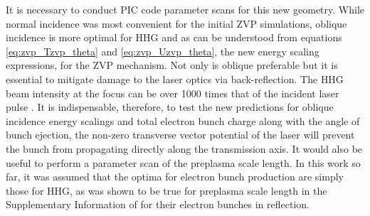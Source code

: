 It is necessary to conduct PIC code parameter scans for this new geometry. While normal incidence was most convenient for the initial ZVP simulations, oblique incidence is more optimal for \ac{HHG} \cite{gonoskovUltrarelativisticNanoplasmonicsRoute2011, edwardsXRayEmissionEffectiveness2020} and as can be understood from equations \ref{eq:zvp_Tzvp_theta} and \ref{eq:zvp_Uzvp_theta}, the new energy scaling expressions, for the ZVP mechanism. Not only is oblique preferable but it is essential to mitigate damage to the laser optics via back-reflection. The \ac{HHG} beam intensity at the focus can be over 1000 times that of the incident laser pulse \cite{quereReflectingPetawattLasers2021}. It is indispensable, therefore, to test the new predictions for oblique incidence energy scalings and total electron bunch charge along with the angle of bunch ejection, the non-zero transverse vector potential of the laser will prevent the bunch from propagating directly along the transmission axis. It would also be useful to perform a parameter scan of the preplasma scale length. In this work so far, it was assumed that the optima for electron bunch production are simply those for \ac{HHG}, as was shown to be true for preplasma scale length in the Supplementary Information of \cite{thevenetVacuumLaserAcceleration2016} for their electron bunches in reflection.

